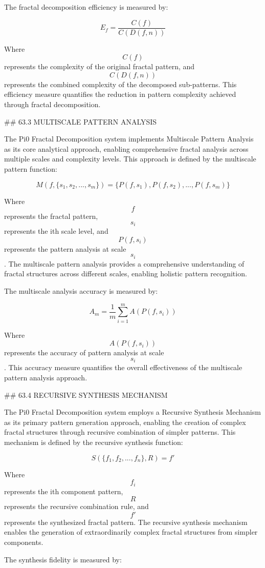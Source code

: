The fractal decomposition efficiency is measured by:

$$ E_f = \frac{C(f)}{C(D(f, n))} $$

Where $$ C(f) $$ represents the complexity of the original fractal pattern, and $$ C(D(f, n)) $$ represents the combined complexity of the decomposed sub-patterns. This efficiency measure quantifies the reduction in pattern complexity achieved through fractal decomposition.

## 63.3 MULTISCALE PATTERN ANALYSIS

The Pi0 Fractal Decomposition system implements Multiscale Pattern Analysis as its core analytical approach, enabling comprehensive fractal analysis across multiple scales and complexity levels. This approach is defined by the multiscale pattern function:

$$ M(f, \{s_1, s_2, ..., s_m\}) = \{P(f, s_1), P(f, s_2), ..., P(f, s_m)\} $$

Where $$ f $$ represents the fractal pattern, $$ s_i $$ represents the ith scale level, and $$ P(f, s_i) $$ represents the pattern analysis at scale $$ s_i $$. The multiscale pattern analysis provides a comprehensive understanding of fractal structures across different scales, enabling holistic pattern recognition.

The multiscale analysis accuracy is measured by:

$$ A_m = \frac{1}{m} \sum_{i=1}^{m} A(P(f, s_i)) $$

Where $$ A(P(f, s_i)) $$ represents the accuracy of pattern analysis at scale $$ s_i $$. This accuracy measure quantifies the overall effectiveness of the multiscale pattern analysis approach.

## 63.4 RECURSIVE SYNTHESIS MECHANISM

The Pi0 Fractal Decomposition system employs a Recursive Synthesis Mechanism as its primary pattern generation approach, enabling the creation of complex fractal structures through recursive combination of simpler patterns. This mechanism is defined by the recursive synthesis function:

$$ S(\{f_1, f_2, ..., f_n\}, R) = f' $$

Where $$ f_i $$ represents the ith component pattern, $$ R $$ represents the recursive combination rule, and $$ f' $$ represents the synthesized fractal pattern. The recursive synthesis mechanism enables the generation of extraordinarily complex fractal structures from simpler components.

The synthesis fidelity is measured by:

